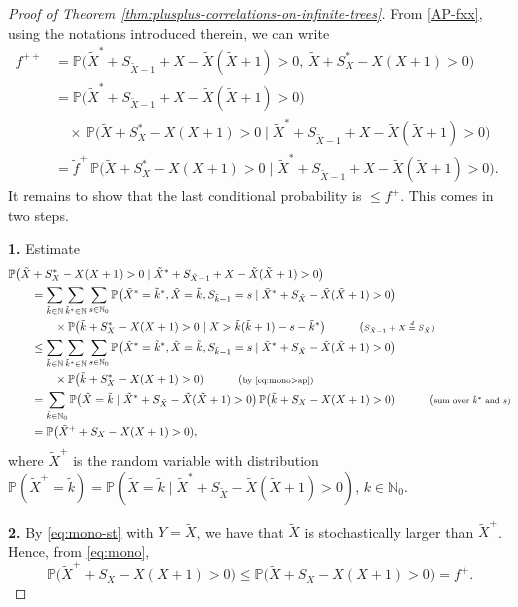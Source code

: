 \documentclass[11pt]{article}
\numberwithin{equation}{section}
\theoremstyle{plain}
\newcommand{\N}{\mathbb N}
\newcommand{\PP}{\mathbb{P}}
\newcommand{\tX}{\tilde{X}}
\newcommand{\tk}{\tilde{k}}
\newcommand{\tf}{{\tilde{f}}}
\begin{document}
\begin{proof}[Proof of Theorem \ref{thm:plusplus-correlations-on-infinite-trees}]
From \eqref{AP-fxx}, using the notations introduced therein, we can write
\begin{align*}
f^{++} &= \PP\big(\tX^* + S_{\tX-1} + X - \tX(\tX+1) > 0,\,\tX + S_X^* -X(X+1) > 0\big)\\
&= \PP\big(\tX^* + S_{\tX-1} + X - \tX(\tX+1)>0 \big) \quad \tag{\scriptsize parent type +}\\
&\quad \times\,\PP\big(\tX + S_X^* - X(X+1) > 0 \mid \tX^* + S_{\tX-1} + X - \tX(\tX+1) > 0\big)
\quad \tag{\scriptsize child type + given parent type +}\\
&= \tf^+\,\PP\big(\tX + S_X^* - X(X+1) > 0 \mid \tX^* + S_{\tX-1} + X - \tX(\tX+1) > 0\big).
\end{align*}
It remains to show that the last conditional probability is $\leq f^{+}$. This comes in two steps. 

\medskip\noindent
{\bf 1.}
Estimate
\begin{align*}
&\PP\big(\tX + S_X^* - X(X+1) > 0 \mid \tX^* + S_{\tX -1}+X - \tX(\tX+1) > 0\big)\\
&\qquad = \sum_{\tk\in\N} \sum_{\tk^*\in\N} \sum_{s\in\N_0} 
\PP\big (\tX^*=\tk^*, \tX=\tk, S_{\tk-1}=s \mid \tX^* + S_{\tX} - \tX(\tX+1) > 0\big)\\
&\qquad \qquad \times \PP\big(\tk + S_X^* - X(X+1) > 0 \mid X  > \tk(\tk+1) - s - \tk^*\big)
\quad \tag{\scriptsize $S_{\tX-1}+X\stackrel{d}{=}S_{\tX}$}\\
&\qquad \leq \sum_{\tk\in\N} \sum_{\tk^*\in\N} \sum_{s\in\N_0} 
\PP\big (\tX^*=\tk^*, \tX=\tk, S_{\tk-1}=s \mid \tX^* + S_{\tX} - \tX(\tX+1) > 0\big)\\
&\qquad \qquad\times\PP\big(\tk + S_X^* -X(X+1) > 0)
\quad \tag{\scriptsize by \eqref{eq:mono>ap}}\\
&\qquad = \sum_{\tk\in\N_0} \PP\big (\tX=\tk \mid \tX^* + S_{\tX} - \tX(\tX+1) > 0\big)
\,\PP\big(\tk + S_X- X(X+1) > 0)
\quad \tag{\scriptsize sum over $\tk^*$ and $s$}\\
&\qquad = \PP\big(\tX^+ +S_X - X(X+1) > 0),
\end{align*}
where $\tX^+$ is the random variable with distribution $\PP(\tX^+=\tk) = \PP(\tX=\tk \mid \tX^* + S_{\tX} -\tX(\tX+1) > 0)$, $k\in\N_0$. 

\medskip\noindent
{\bf 2.} 
By \eqref{eq:mono-st} with $Y=\tX$, we have that $\tX$ is stochastically larger than $\tX^+$. Hence, from \eqref{eq:mono},
\[
\PP\big(\tX^+ + S_X - X(X+1) > 0) \leq \PP\big(\tX + S_X - X(X+1) > 0) = f^+.
\] 
\end{proof}
\end{document}
